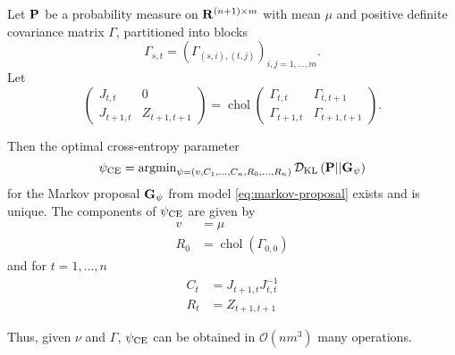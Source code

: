\begin{theorem}
    \label{prop:cem-for-markov-proposal}
    Let $\P$ be a probability measure on $\R^{(n+1)\times m}$ with mean $\mu$ and positive definite covariance matrix $\Gamma$, partitioned into blocks 
    $$
        \Gamma_{s,t} = (\Gamma_{(s,i),(t,j)})_{i,j =1,\dots,m}.
    $$
    Let
    $$
        \begin{pmatrix}
            J_{t,t} & 0 \\
            J_{t + 1, t} & Z_{t+1, t+1}
        \end{pmatrix} = \operatorname{chol} \begin{pmatrix}
            \Gamma_{t,t} & \Gamma_{t, t + 1} \\
            \Gamma_{t + 1, t} & \Gamma_{t + 1, t + 1}
        \end{pmatrix}.
    $$

    Then the optimal cross-entropy parameter
    $$
        \pce = \argmin_{\psi = (v, C_{1}, \dots, C_{n}, R_{0}, \dots, R_{n})} \Dkl{\P}{\G_{\psi}}
    $$
    for the Markov proposal $\G_{\psi}$ from model \eqref{eq:markov-proposal} exists and is unique. The components of $\pce$ are given by 
    \begin{align*}
        v &= \mu\\
        R_{0} &= \operatorname{chol} (\Gamma_{0,0}) 
    \end{align*}
    and for $t = 1, \dots, n$
    \begin{align*}
        C_{t} &= J_{t + 1, t} J_{t, t}^{-1}\\
        R_{t} &= Z_{t + 1, t + 1}
    \end{align*}

    Thus, given $\nu$ and $\Gamma$, $\pce$ can be obtained in $\mathcal O(nm^{3})$ many operations.
\end{theorem}


